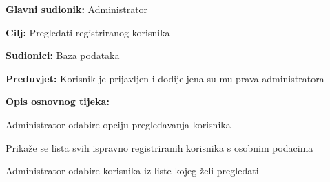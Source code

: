 				\noindent {}
					\begin{packed_item}
	
						\item \textbf{Glavni sudionik: }Administrator
						\item  \textbf{Cilj:} Pregledati registriranog korisnika
						\item  \textbf{Sudionici:} Baza podataka
						\item  \textbf{Preduvjet:} Korisnik je prijavljen i dodijeljena su mu prava administratora
						\item  \textbf{Opis osnovnog tijeka:}
						
						\item[] \begin{packed_enum}
	
							\item Administrator odabire opciju pregledavanja korisnika
							\item Prikaže se lista svih ispravno registriranih korisnika s osobnim podacima
							\item Administrator odabire korisnika iz liste kojeg želi pregledati

						\end{packed_enum}						
					\end{packed_item}
					
